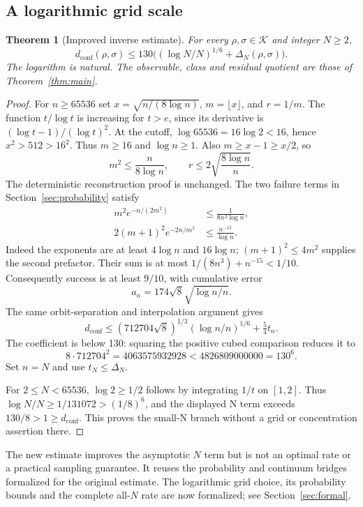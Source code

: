 \documentclass[11pt]{article}
\newtheorem{theorem}{Theorem}[section]
\theoremstyle{remark}
\newcommand{\K}{\mathcal K}
\newcommand{\dc}{d_{\mathrm{conf}}}
\begin{document}
\subsection{A logarithmic grid scale}
\begin{theorem}[Improved inverse estimate]\label{thm:improved}
For every $\rho,\sigma\in\K$ and integer $N\ge2$,
\[
 \dc(\rho,\sigma)\le130\bigl((\log N/N)^{1/6}+\Delta_N(\rho,\sigma)\bigr).
\]
The logarithm is natural. The observable, class and residual quotient
are those of Theorem~\ref{thm:main}.
\end{theorem}
\begin{proof}
For $n\ge65536$ set $x=\sqrt{n/(8\log n)}$, $m=\lfloor x\rfloor$,
and $r=1/m$. The function $t/\log t$ is increasing for $t>e$, since
its derivative is $(\log t-1)/(\log t)^2$. At the cutoff,
$\log65536=16\log2<16$, hence $x^2>512>16^2$.
Thus $m\ge16$ and $\log n\ge1$. Also $m\ge x-1\ge x/2$, so
\[
 m^2\le\frac{n}{8\log n},\qquad
 r\le2\sqrt{\frac{8\log n}{n}}.
\]
The deterministic reconstruction proof is unchanged. The two failure
terms in Section~\ref{sec:probability} satisfy
\begin{align*}
 m^2e^{-n/(2m^2)}&\le\frac{1}{8n^3\log n},\\
 2(m+1)^2e^{-2n/m^2}&\le\frac{n^{-15}}{\log n}.
\end{align*}
Indeed the exponents are at least $4\log n$ and $16\log n$;
$(m+1)^2\le4m^2$ supplies the second prefactor. Their sum is at most
$1/(8n^3)+n^{-15}<1/10$. Consequently success is at least $9/10$,
with cumulative error
\[
 a_n=174\sqrt8\sqrt{\log n/n}.
\]
The same orbit-separation and interpolation argument gives
\[
 \dc\le(712704\sqrt8)^{1/3}(\log n/n)^{1/6}+\tfrac54t_n.
\]
The coefficient is below 130: squaring the positive cubed comparison
reduces it to
\[
 8\cdot712704^2=4063575932928<4826809000000=130^6.
\]
Set $n=N$ and use $t_N\le\Delta_N$.

For $2\le N<65536$, $\log2\ge1/2$ follows by integrating $1/t$
on $[1,2]$. Thus $\log N/N\ge1/131072>(1/8)^6$, and the
displayed N term exceeds $130/8>1\ge\dc$. This proves the small-N
branch without a grid or concentration assertion there.
\end{proof}

The new estimate improves the asymptotic $N$ term but is not an optimal
rate or a practical sampling guarantee. It reuses the probability and
continuum bridges formalized for the original estimate. The logarithmic
grid choice, its probability bounds and the complete all-$N$ rate are
now formalized; see Section~\ref{sec:formal}.
\end{document}
